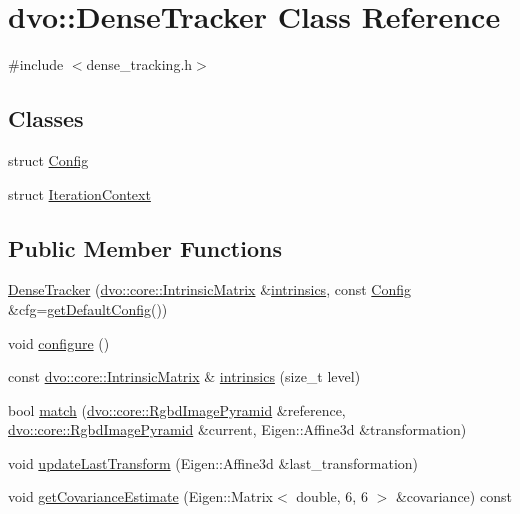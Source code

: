 \hypertarget{classdvo_1_1_dense_tracker}{}\section{dvo\+:\+:Dense\+Tracker Class Reference}
\label{classdvo_1_1_dense_tracker}


{\ttfamily \#include $<$dense\+\_\+tracking.\+h$>$}

\subsection*{Classes}
\begin{DoxyCompactItemize}
\item 
struct \mbox{\hyperlink{structdvo_1_1_dense_tracker_1_1_config}{Config}}
\item 
struct \mbox{\hyperlink{structdvo_1_1_dense_tracker_1_1_iteration_context}{Iteration\+Context}}
\end{DoxyCompactItemize}
\subsection*{Public Member Functions}
\begin{DoxyCompactItemize}
\item 
\mbox{\hyperlink{classdvo_1_1_dense_tracker_a48f7e802113a0e8840cea6cae0ef580e}{Dense\+Tracker}} (\mbox{\hyperlink{structdvo_1_1core_1_1_intrinsic_matrix}{dvo\+::core\+::\+Intrinsic\+Matrix}} \&\mbox{\hyperlink{classdvo_1_1_dense_tracker_a55d2374fbb13ef7846a535e1869fb880}{intrinsics}}, const \mbox{\hyperlink{structdvo_1_1_dense_tracker_1_1_config}{Config}} \&cfg=\mbox{\hyperlink{classdvo_1_1_dense_tracker_a81b87df428095d10a86c996d6f2fc900}{get\+Default\+Config}}())
\item 
void \mbox{\hyperlink{classdvo_1_1_dense_tracker_afcffed696e4d35768123e61e2b988e53}{configure}} ()
\item 
const \mbox{\hyperlink{structdvo_1_1core_1_1_intrinsic_matrix}{dvo\+::core\+::\+Intrinsic\+Matrix}} \& \mbox{\hyperlink{classdvo_1_1_dense_tracker_a55d2374fbb13ef7846a535e1869fb880}{intrinsics}} (size\+\_\+t level)
\item 
bool \mbox{\hyperlink{classdvo_1_1_dense_tracker_a120bade1d07eb480e7334524b3db8383}{match}} (\mbox{\hyperlink{structdvo_1_1core_1_1_rgbd_image_pyramid}{dvo\+::core\+::\+Rgbd\+Image\+Pyramid}} \&reference, \mbox{\hyperlink{structdvo_1_1core_1_1_rgbd_image_pyramid}{dvo\+::core\+::\+Rgbd\+Image\+Pyramid}} \&current, Eigen\+::\+Affine3d \&transformation)
\item 
void \mbox{\hyperlink{classdvo_1_1_dense_tracker_ae4b3faebac29274632ce464b7b016efe}{update\+Last\+Transform}} (Eigen\+::\+Affine3d \&last\+\_\+transformation)
\item 
void \mbox{\hyperlink{classdvo_1_1_dense_tracker_a3ba8de244b244d9bffe62b84751672ea}{get\+Covariance\+Estimate}} (Eigen\+::\+Matrix$<$ double, 6, 6 $>$ \&covariance) const
\end{DoxyCompactItemize}

